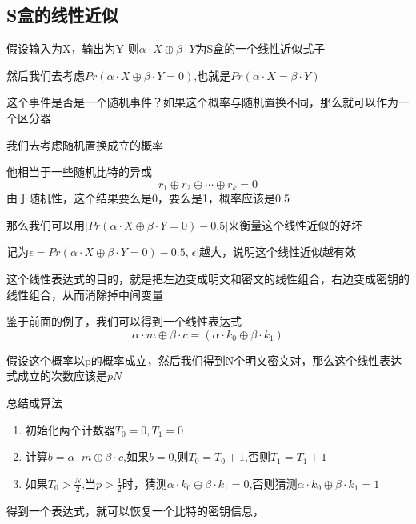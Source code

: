 \documentclass[12pt,a4paper]{article}
\begin{document}
\subsection{S盒的线性近似}
假设输入为X，输出为Y
则\(\alpha \cdot X \oplus \beta \cdot Y\)为S盒的一个线性近似式子

然后我们去考虑\(Pr(\alpha \cdot X \oplus \beta \cdot Y = 0)\),也就是\(Pr(\alpha \cdot X = \beta \cdot Y)\)

这个事件是否是一个随机事件？如果这个概率与随机置换不同，那么就可以作为一个区分器

我们去考虑随机置换成立的概率

他相当于一些随机比特的异或
\[
r_1 \oplus r_2 \oplus \cdots \oplus r_k = 0
\]
由于随机性，这个结果要么是0，要么是1，概率应该是0.5

那么我们可以用\(|Pr(\alpha \cdot X \oplus \beta \cdot Y = 0) - 0.5|\)来衡量这个线性近似的好坏

记为\(\epsilon = Pr(\alpha \cdot X \oplus \beta \cdot Y = 0) - 0.5\),\(|\epsilon|\)越大，说明这个线性近似越有效

这个线性表达式的目的，就是把左边变成明文和密文的线性组合，右边变成密钥的线性组合，从而消除掉中间变量

鉴于前面的例子，我们可以得到一个线性表达式
\[
\alpha \cdot m \oplus \beta \cdot c = (\alpha \cdot k_0 \oplus \beta \cdot k_1)
\]

假设这个概率以p的概率成立，然后我们得到N个明文密文对，那么这个线性表达式成立的次数应该是\(pN\)

总结成算法
\begin{enumerate}
    \item 初始化两个计数器\(T_0=0,T_1=0\)
    \item 计算\(b = \alpha \cdot m \oplus \beta \cdot c\),如果\(b=0\),则\(T_0 = T_0 + 1\),否则\(T_1 = T_1 + 1\)
    \item 如果\(T_0 > \frac{N}{2}\),当\(p>\frac{1}{2}\)时，猜测\(\alpha \cdot k_0 \oplus \beta \cdot k_1 = 0\),否则猜测\(\alpha \cdot k_0 \oplus \beta \cdot k_1 = 1\)
\end{enumerate}

得到一个表达式，就可以恢复一个比特的密钥信息，
\end{document}
